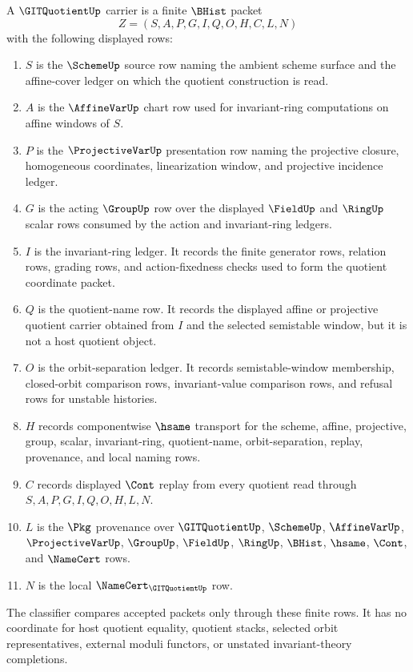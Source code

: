 \begin{definition}
\label{def:git-quotient-carrier}
A $\GITQuotientUp$ carrier is a finite $\BHist$ packet
$$
Z=(S,A,P,G,I,Q,O,H,C,L,N)
$$
with the following displayed rows:
\begin{enumerate}
\item $S$ is the $\SchemeUp$ source row naming the ambient scheme surface and the affine-cover ledger on which the quotient construction is read.
\item $A$ is the $\AffineVarUp$ chart row used for invariant-ring computations on affine windows of $S$.
\item $P$ is the $\ProjectiveVarUp$ presentation row naming the projective closure, homogeneous coordinates, linearization window, and projective incidence ledger.
\item $G$ is the acting $\GroupUp$ row over the displayed $\FieldUp$ and $\RingUp$ scalar rows consumed by the action and invariant-ring ledgers.
\item $I$ is the invariant-ring ledger. It records the finite generator rows, relation rows, grading rows, and action-fixedness checks used to form the quotient coordinate packet.
\item $Q$ is the quotient-name row. It records the displayed affine or projective quotient carrier obtained from $I$ and the selected semistable window, but it is not a host quotient object.
\item $O$ is the orbit-separation ledger. It records semistable-window membership, closed-orbit comparison rows, invariant-value comparison rows, and refusal rows for unstable histories.
\item $H$ records componentwise $\hsame$ transport for the scheme, affine, projective, group, scalar, invariant-ring, quotient-name, orbit-separation, replay, provenance, and local naming rows.
\item $C$ records displayed $\Cont$ replay from every quotient read through $S,A,P,G,I,Q,O,H,L,N$.
\item $L$ is the $\Pkg$ provenance over $\GITQuotientUp$, $\SchemeUp$, $\AffineVarUp$, $\ProjectiveVarUp$, $\GroupUp$, $\FieldUp$, $\RingUp$, $\BHist$, $\hsame$, $\Cont$, and $\NameCert$ rows.
\item $N$ is the local $\NameCert_{\GITQuotientUp}$ row.
\end{enumerate}
The classifier compares accepted packets only through these finite rows. It has no coordinate for host quotient equality, quotient stacks, selected orbit representatives, external moduli functors, or unstated invariant-theory completions.
\end{definition}

